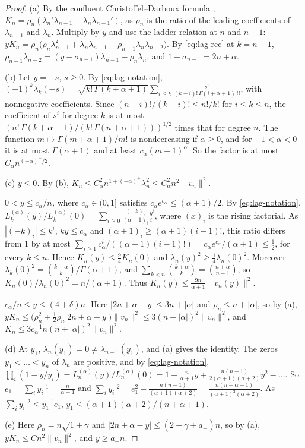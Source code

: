 \documentclass[11pt]{amsart}
\theoremstyle{definition}
\theoremstyle{remark}
\numberwithin{equation}{section}
\begin{document}
\begin{proof}
(a) By the confluent Christoffel--Darboux formula \cite[Theorem~3.2.2]{Sz}, $K_n=\rho_n(\lambda_n'\lambda_{n-1}-\lambda_n\lambda_{n-1}')$, as $\rho_n$ is the ratio of the leading coefficients of $\lambda_{n-1}$ and $\lambda_n$. Multiply by $y$ and use the ladder relation at $n$ and $n-1$: $yK_n=\rho_n\bigl(\rho_n\lambda_{n-1}^2+\lambda_n\lambda_{n-1}-\rho_{n-1}\lambda_n\lambda_{n-2}\bigr)$. By \eqref{eq:lag-rec} at $k=n-1$, $\rho_{n-1}\lambda_{n-2}=(y-\sigma_{n-1})\lambda_{n-1}-\rho_n\lambda_n$, and $1+\sigma_{n-1}=2n+\alpha$.

(b) Let $y=-s$, $s\ge0$. By \eqref{eq:lag-notation}, $(-1)^k\lambda_k(-s)=\sqrt{k!\,\Gamma(k+\alpha+1)}\sum_{i\le k}\frac{s^i}{(k-i)!\,\Gamma(i+\alpha+1)\,i!}$, with nonnegative coefficients. Since $(n-i)!/(k-i)!\le n!/k!$ for $i\le k\le n$, the coefficient of $s^i$ for degree $k$ is at most $(n!\,\Gamma(k+\alpha+1)/(k!\,\Gamma(n+\alpha+1)))^{1/2}$ times that for degree $n$. The function $m\mapsto\Gamma(m+\alpha+1)/m!$ is nondecreasing if $\alpha\ge0$, and for $-1<\alpha<0$ it is at most $\Gamma(\alpha+1)$ and at least $c_\alpha(m+1)^\alpha$. So the factor is at most $C_\alpha n^{(-\alpha)^+/2}$.

(c) \emph{$y\le0$.} By (b), $K_n\le C_\alpha^2n^{1+(-\alpha)^+}\lambda_n^2\le C_\alpha^2n^2\|v_n\|^2$.

\emph{$0<y\le c_\alpha/n$,} where $c_\alpha\in(0,1]$ satisfies $c_\alpha e^{c_\alpha}\le(\alpha+1)/2$. By \eqref{eq:lag-notation}, $L^{(\alpha)}_k(y)/L^{(\alpha)}_k(0)=\sum_{i\ge0}\frac{(-k)_i}{(\alpha+1)_i}\frac{y^i}{i!}$, where $(x)_i$ is the rising factorial. As $|(-k)_i|\le k^i$, $ky\le c_\alpha$ and $(\alpha+1)_i\ge(\alpha+1)(i-1)!$, this ratio differs from $1$ by at most $\sum_{i\ge1}c_\alpha^i/((\alpha+1)(i-1)!)=c_\alpha e^{c_\alpha}/(\alpha+1)\le\frac12$, for every $k\le n$. Hence $K_n(y)\le\frac94K_n(0)$ and $\lambda_n(y)^2\ge\frac14\lambda_n(0)^2$. Moreover $\lambda_k(0)^2=\binom{k+\alpha}k/\Gamma(\alpha+1)$, and $\sum_{k<n}\binom{k+\alpha}k=\binom{n+\alpha}{n-1}$, so $K_n(0)/\lambda_n(0)^2=n/(\alpha+1)$. Thus $K_n(y)\le\frac{9n}{\alpha+1}\|v_n(y)\|^2$.

\emph{$c_\alpha/n\le y\le(4+\delta)n$.} Here $|2n+\alpha-y|\le3n+|\alpha|$ and $\rho_n\le n+|\alpha|$, so by (a), $yK_n\le\bigl(\rho_n^2+\frac12\rho_n|2n+\alpha-y|\bigr)\|v_n\|^2\le3(n+|\alpha|)^2\|v_n\|^2$, and $K_n\le3c_\alpha^{-1}n(n+|\alpha|)^2\|v_n\|^2$.

(d) At $y_1$, $\lambda_n(y_1)=0\ne\lambda_{n-1}(y_1)$, and (a) gives the identity. The zeros $y_1<\dots<y_n$ of $\lambda_n$ are positive, and by \eqref{eq:lag-notation}, $\prod_i(1-y/y_i)=L^{(\alpha)}_n(y)/L^{(\alpha)}_n(0)=1-\frac n{\alpha+1}y+\frac{n(n-1)}{2(\alpha+1)(\alpha+2)}y^2-\dots$. So $e_1=\sum_iy_i^{-1}=\frac n{\alpha+1}$ and $\sum_iy_i^{-2}=e_1^2-\frac{n(n-1)}{(\alpha+1)(\alpha+2)}=\frac{n(n+\alpha+1)}{(\alpha+1)^2(\alpha+2)}$. As $\sum_iy_i^{-2}\le y_1^{-1}e_1$, $y_1\le(\alpha+1)(\alpha+2)/(n+\alpha+1)$.

(e) Here $\rho_n=n\sqrt{1+\gamma}$ and $|2n+\alpha-y|\le(2+\gamma+a_+)n$, so by (a), $yK_n\le Cn^2\|v_n\|^2$, and $y\ge a_-n$.
\end{proof}
\end{document}
